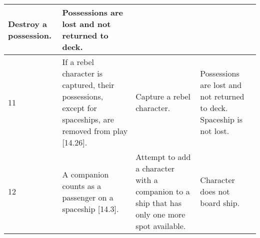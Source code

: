 \begin{center}
\begin{longtable}{| p{.5cm} | p{4.5cm} | p{4.5cm} | p{4.5cm} |}
    Destroy a possession. &

    Possessions are lost and not returned to deck. 

    \\ \hline

    11 &

    If a rebel character is captured, their possessions, except for
    spaceships, are removed from play [14.26]. &

    Capture a rebel character. &

    Possessions are lost and not returned to deck. Spaceship is not
    lost.

    \\ \hline

    12 &

    A companion counts as a passenger on a spaceship [14.3]. &

    Attempt to add a character with a companion to a ship that has
    only one more spot available. &

    Character does not board ship.

    \\ \hline

  \end{longtable}

\end{center}

